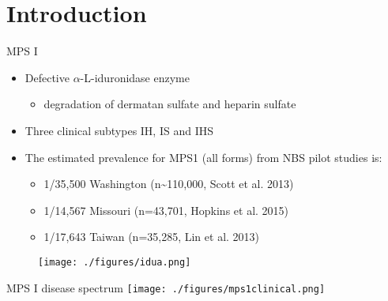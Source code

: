 \documentclass[presentation, smaller]{beamer}
\begin{document}
\section{Introduction}
\label{sec:orgheadline4}
\begin{frame}[label={sec:orgheadline1}]{MPS I}
\begin{itemize}
\item Defective \(\alpha\)-L-iduronidase enzyme
\begin{itemize}
\item degradation of dermatan sulfate and heparin sulfate
\end{itemize}
\item Three clinical subtypes IH, IS and IHS

\item The estimated prevalence for MPS1 (all forms) from NBS pilot studies is: 
\begin{itemize}
\item 1/35,500 Washington ​(n\textasciitilde{}110,000, Scott et al. 2013)
\item 1/14,567 Missouri ​(n=43,701, Hopkins et al. 2015)
\item 1/17,643 Taiwan ​(n=35,285, Lin et al. 2013)
\end{itemize}
\end{itemize}


\begin{figure}[htb]
\centering
\texttt{[image: ./figures/idua.png]}
\label{fig:idua}
\end{figure}
\end{frame}


\begin{frame}[label={sec:orgheadline2}]{MPS I disease spectrum}
\texttt{[image: ./figures/mps1clinical.png]}
\end{frame}
\end{document}
